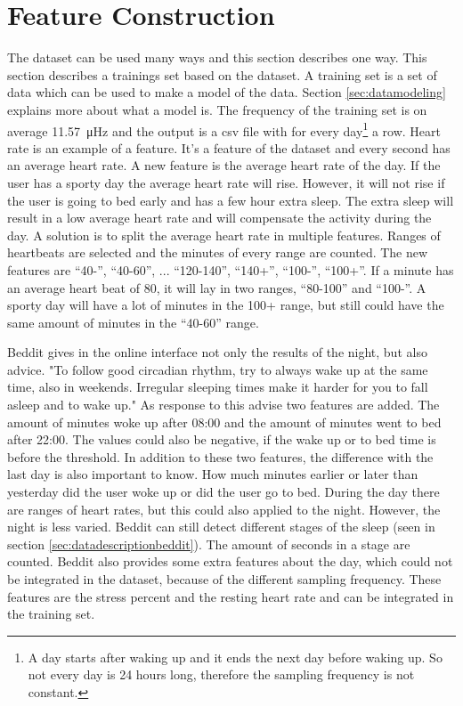 	\section{Feature Construction}
		\label{sec:feature}
				The dataset can be used many ways and this section describes one way. This section describes a trainings set based on the dataset. A training set is a set of data which can be used to make a model of the data. Section \ref{sec:datamodeling} explains more about what a model is. The frequency of the training set is on average \SI{11.57}{\micro\hertz} and the output is a csv file with for every day\footnote{A day starts after waking up and it ends the next day before waking up. So not every day is 24 hours long, therefore the sampling frequency is not constant.} a row. Heart rate is an example of a feature. It's a feature of the dataset and every second has an average heart rate. A new feature is the average heart rate of the day. If the user has a sporty day the average heart rate will rise. However, it will not rise if the user is going to bed early and has a few hour extra sleep. The extra sleep will result in a low average heart rate and will compensate the activity during the day. A solution is to split the average heart rate in multiple features. Ranges of heartbeats are selected and the minutes of every range are counted. The new features are ``40-'', ``40-60'', ... ``120-140'', ``140+'', ``100-'', ``100+''. If a minute has an average heart beat of 80, it will lay in two ranges, ``80-100'' and ``100-''. A sporty day will have a lot of minutes in the 100+ range, but still could have the same amount of minutes in the ``40-60'' range. 

			Beddit gives in the online interface not only the results of the night, but also advice. "To follow good circadian rhythm, try to always wake up at the same time, also in weekends. Irregular sleeping times make it harder for you to fall asleep and to wake up." As response to this advise two features are added. The amount of minutes woke up after 08:00 and the amount of minutes went to bed after 22:00. The values could also be negative, if the wake up or to bed time is before the threshold. In addition to these two features, the difference with the last day is also important to know. How much minutes earlier or later than yesterday did the user woke up or did the user go to bed. 
			During the day there are ranges of heart rates, but this could also applied to the night. However, the night is less varied. Beddit can still detect different stages of the sleep (seen in section \ref{sec:datadescriptionbeddit}). The amount of seconds in a stage are counted.
			 Beddit also provides some extra features about the day, which could not be integrated in the dataset, because of the different sampling frequency. These features are the stress percent and the resting heart rate and can be integrated in the training set.
				
